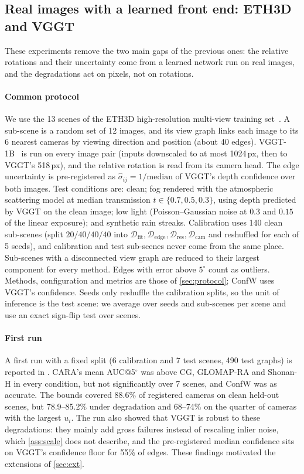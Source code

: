 \subsection{Real images with a learned front end: ETH3D and VGGT}\label{sec:eth3d}
These experiments remove the two main gaps of the previous ones: the relative rotations and their uncertainty come from a learned network run on real images, and the degradations act on pixels, not on rotations.

\paragraph{Common protocol} We use the 13 scenes of the ETH3D high-resolution multi-view training set~\cite{schops2017eth3d}. A sub-scene is a random set of 12 images, and its view graph links each image to its 6 nearest cameras by viewing direction and position (about 40 edges). VGGT-1B~\cite{wang2025vggt} is run on every image pair (inputs downscaled to at most 1024\,px, then to VGGT's 518\,px), and the relative rotation is read from its camera head. The edge uncertainty is pre-registered as $\hat\sigma_{ij}=1/\mathrm{median}$ of VGGT's depth confidence over both images. Test conditions are: clean; fog rendered with the atmospheric scattering model at median transmission $t\in\{0.7,0.5,0.3\}$, using depth predicted by VGGT on the clean image; low light (Poisson--Gaussian noise at $0.3$ and $0.15$ of the linear exposure); and synthetic rain streaks. Calibration uses 140 clean sub-scenes (split $20/40/40/40$ into $\mathcal{D}_{\mathrm{fit}},\mathcal{D}_{\mathrm{edge}},\mathcal{D}_{\mathrm{res}},\mathcal{D}_{\mathrm{cam}}$ and reshuffled for each of 5 seeds), and calibration and test sub-scenes never come from the same place. Sub-scenes with a disconnected view graph are reduced to their largest component for every method. Edges with error above $5^\circ$ count as outliers. Methods, configuration and metrics are those of \cref{sec:protocol}; ConfW uses VGGT's confidence. Seeds only reshuffle the calibration splits, so the unit of inference is the test scene: we average over seeds and sub-scenes per scene and use an exact sign-flip test over scenes.

\paragraph{First run} A first run with a fixed split (6 calibration and 7 test scenes, 490 test graphs) is reported in . CARA's mean AUC@5$^\circ$ was above CG, GLOMAP-RA and Shonan-H in every condition, but not significantly over 7 scenes, and ConfW was as accurate. The bounds covered 88.6\% of registered cameras on clean held-out scenes, but 78.9--85.2\% under degradation and 68--74\% on the quarter of cameras with the largest $u_i$. The run also showed that VGGT is robust to these degradations: they mainly add gross failures instead of rescaling inlier noise, which \cref{ass:scale} does not describe, and the pre-registered median confidence sits on VGGT's confidence floor for 55\% of edges. These findings motivated the extensions of \cref{sec:ext}.

